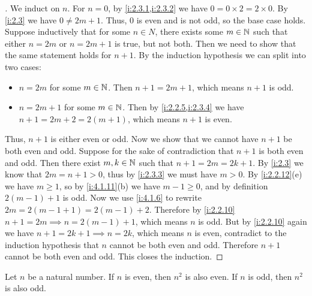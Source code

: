 \begin{proof}[]
  We induct on \(n\).
  For \(n = 0\), by \cref{i:2.3.1,i:2.3.2} we have \(0 = 0 \times 2 = 2 \times 0\).
  By \cref{i:2.3} we have \(0 \neq 2m + 1\).
  Thus, \(0\) is even and is not odd, so the base case holds.
  Suppose inductively that for some \(n \in N\), there exists some \(m \in \mathbb{N}\) such that either \(n = 2m\) or \(n = 2m + 1\) is true, but not both.
  Then we need to show that the same statement holds for \(n + 1\).
  By the induction hypothesis we can split into two cases:
  \begin{itemize}
    \item \(n = 2m\) for some \(m \in \mathbb{N}\).
          Then \(n + 1 = 2m + 1\), which means \(n + 1\) is odd.
    \item \(n = 2m + 1\) for some \(m \in \mathbb{N}\).
          Then by \cref{i:2.2.5,i:2.3.4} we have \(n + 1 = 2m + 2 = 2(m + 1)\), which means \(n + 1\) is even.
  \end{itemize}
  Thus, \(n + 1\) is either even or odd.
  Now we show that we cannot have \(n + 1\) be both even and odd.
  Suppose for the sake of contradiction that \(n + 1\) is both even and odd.
  Then there exist \(m, k \in \mathbb{N}\) such that \(n + 1 = 2m = 2k + 1\).
  By \cref{i:2.3} we know that \(2m = n + 1 > 0\), thus by \cref{i:2.3.3} we must have \(m > 0\).
  By \cref{i:2.2.12}(e) we have \(m \geq 1\), so by \cref{i:4.1.11}(b) we have \(m - 1 \geq 0\), and by definition \(2(m - 1) + 1\) is odd.
  Now we use \cref{i:4.1.6} to rewrite \(2m = 2 (m - 1 + 1) = 2 (m - 1) + 2\).
  Therefore by \cref{i:2.2.10} \(n + 1 = 2m \implies n = 2 (m - 1) + 1\), which means \(n\) is odd.
  But by \cref{i:2.2.10} again we have \(n + 1 = 2k + 1 \implies n = 2k\), which means \(n\) is even, contradict to the induction hypothesis that \(n\) cannot be both even and odd.
  Therefore \(n + 1\) cannot be both even and odd.
  This closes the induction.
\end{proof}

\begin{ac}\label{i:ac:4.4.3}
  Let \(n\) be a natural number.
  If \(n\) is even, then \(n^2\) is also even.
  If \(n\) is odd, then \(n^2\) is also odd.
\end{ac}

